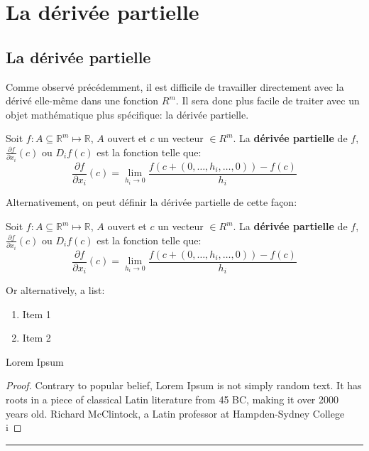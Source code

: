 \documentclass[12pt]{report}
\let\Bbb\mathbb
\theoremstyle{definition}
\newenvironment{preuve}{\renewcommand{\proofname}{Preuve}\begin{proof}}{\end{proof}\noindent\textcolor[RGB]{220,220,220}{\rule{\textwidth}{1pt}}}
\begin{document}
\chapter{La dérivée partielle}
\section{La dérivée partielle}
    Comme observé précédemment, il est difficile de travailler directement avec la dérivé elle-même
    dans une fonction $R^m$. Il sera donc plus facile de traiter avec un objet mathématique plus spécifique:
    la dérivée partielle.    
    \begin{defi}
        \label{def:derivee_partielle_1}
        Soit $f: A \subseteq \Bbb R^m \mapsto \Bbb R$, $A$ ouvert et $c$ un vecteur $\in R^m$.
        La \textbf{dérivée partielle} de $f$, $\frac{\partial f}{\partial x_i}(c)$ ou $D_i f(c)$
        est la fonction telle que:
        $$\frac{\partial f}{\partial x_i}(c) = \lim_{h_i \to 0} \frac{f(c + (0,\dots,h_i,\dots,0)) - f(c)}{h_i}$$
    \end{defi}
    Alternativement, on peut définir la dérivée partielle de cette façon:
    \begin{defi}
        \label{def:derivee_partielle_1}
        Soit $f: A \subseteq \Bbb R^m \mapsto \Bbb R$, $A$ ouvert et $c$ un vecteur $\in R^m$.
        La \textbf{dérivée partielle} de $f$, $\frac{\partial f}{\partial x_i}(c)$ ou $D_i f(c)$
        est la fonction telle que:
        $$\frac{\partial f}{\partial x_i}(c) = \lim_{h_i \to 0} \frac{f(c + (0,\dots,h_i,\dots,0)) - f(c)}{h_i}$$
    \end{defi}

    Or alternatively, a list:
    \begin{enumerate}
        \setlength{\itemsep}{0pt}
        \item Item 1
        \item Item 2
    \end{enumerate}

    \begin{prop}
        \label{thm:THEOREM}
        Lorem Ipsum
    \end{prop}
    \begin{preuve}
        Contrary to popular belief, Lorem Ipsum is not simply random text. 
        It has roots in a piece of classical Latin literature from 45 BC, 
        making it over 2000 years old. Richard McClintock, a Latin professor at Hampden-Sydney College i
    \end{preuve}
\end{document}

